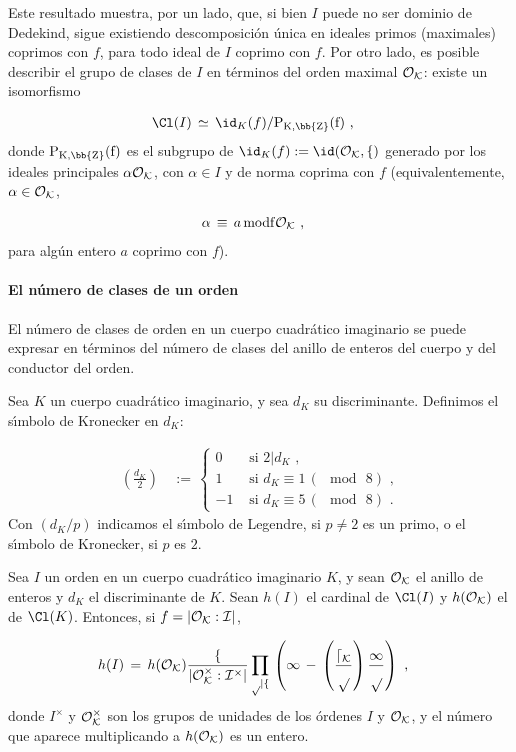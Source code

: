 Este resultado muestra, por un lado, que, si bien $I$ puede no
ser dominio de Dedekind, sigue existiendo descomposici\'{o}n
\'{u}nica en ideales primos (maximales) coprimos con $f$,
para todo ideal de $I$ coprimo con $f$. Por otro lado, es posible
describir el grupo de clases de $I$ en t\'{e}rminos del orden
maximal $\cal{O}_{K}$: existe un isomorfismo

\begin{align*}
\Cl(I) & \,\simeq\,\id_{K}(f)/\rm{P}_{K,\bb{Z}}(f)
\text{ ,}
\end{align*}
donde $\rm{P}_{K,\bb{Z}}(f)$ es el subgrupo de
$\id_{K}(f):=\id(\cal{O}_{K},f)$ generado por los ideales principales
$\alpha\cal{O}_{K}$, con $\alpha\in I$ y de norma coprima con $f$
(equivalentemente, $\alpha\in\cal{O}_{K}$,

\begin{align*}
\alpha & \,\equiv\, a\,\rm{mod}f\cal{O}_{K}
\text{ ,}
\end{align*}
para alg\'{u}n entero $a$ coprimo con $f$).

\paragraph{El n\'{u}mero de clases de un orden}

El n\'{u}mero de clases de orden en un cuerpo cuadr\'{a}tico imaginario
se puede expresar en t\'{e}rminos del n\'{u}mero de clases del
anillo de enteros del cuerpo y del conductor del orden.

Sea $K$ un cuerpo cuadr\'{a}tico imaginario, y sea $d_{K}$ su discriminante.
Definimos el s\'{\i}mbolo de Kronecker en $d_{K}$:

\begin{align*}
 \left(\frac{d_{K}}{2}\right) & \,:=\,
 \begin{cases}
  0 & \text{ si } 2|d_{K}\text{ ,}\\
  1 & \text{ si } d_{K}\equiv 1\,(\mod\,8)\text{ ,}\\
  -1 & \text{ si } d_{K}\equiv 5\,(\mod\,8)\text{ .}
 \end{cases}
\end{align*}
Con $(d_{K}/p)$ indicamos el s\'{\i}mbolo de Legendre, si $p\not = 2$ es
un primo, o el s\'{\i}mbolo de Kronecker, si $p$ es $2$.

\begin{teoNumDeClassRel}
 Sea $I$ un orden en un cuerpo cuadr\'{a}tico imaginario $K$, y sean
 $\cal{O}_{K}$ el anillo de enteros y $d_{K}$ el discriminante de $K$.
 Sean $h(I)$ el cardinal de $\Cl(I)$ y $h(\cal{O}_{K})$ el de $\Cl(K)$.
 Entonces, si $f=|\cal{O}_{K}:I|$,

 \begin{align*}
  h(I) & \,=\,h(\cal{O}_{K})\frac{f}{|\cal{O}_{K}^{\times}:I^{\times}|}
  \prod_{p|f}\,\left( 1\,-\,\left( \frac{d_{K}}{p} \right)\frac{1}{p} \right)
  \text{ ,}
 \end{align*}
donde $I^{\times}$ y $\cal{O}_{K}^{\times}$ son los grupos de unidades de los
\'{o}rdenes $I$ y $\cal{O}_{K}$, y el n\'{u}mero que aparece multiplicando a
$h(\cal{O}_{K})$ es un entero.
\end{teoNumDeClassRel}

